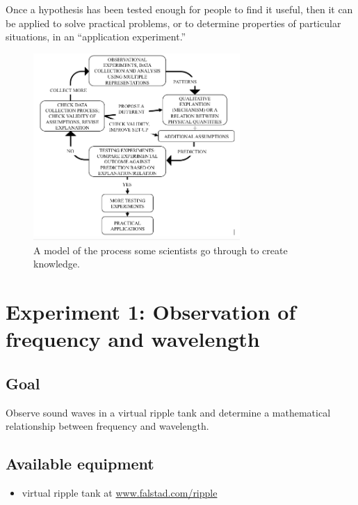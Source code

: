 Once a hypothesis has been tested enough for people to find it useful, then it can be applied to solve practical problems, or to determine properties of particular situations, in an ``application experiment.''

\begin{figure}
	\centering
	\includegraphics[width=0.7\textwidth]{ripple-tank-remote/islegraphic.png}
	\caption{A model of the process some scientists go through to create knowledge.\cite{etkina_millikan_2015}}\label{me:fig:isle}
\end{figure}

\section{Experiment 1: Observation of frequency and wavelength}

\subsection{Goal}

Observe sound waves in a virtual ripple tank and determine a mathematical relationship between frequency and wavelength.

\subsection{Available equipment}

\begin{itemize}
	\item virtual ripple tank at \url{www.falstad.com/ripple}
\end{itemize}


